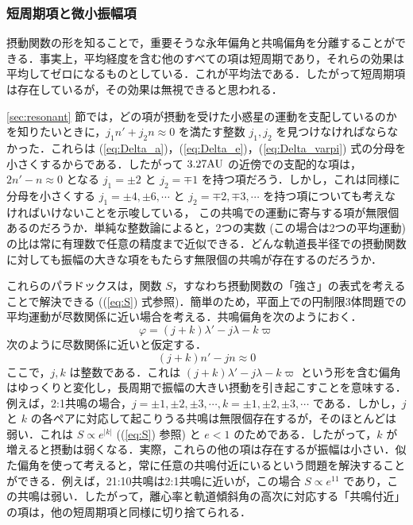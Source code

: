 \documentclass[11pt,a4paper,oneside,onecolumn]{jreport}
\begin{document}
\subsubsection{短周期項と微小振幅項}
摂動関数の形を知ることで，重要そうな永年偏角と共鳴偏角を分離することができる．事実上，平均経度を含む他のすべての項は短周期であり，それらの効果は平均してゼロになるものとしている．これが平均法である．したがって短周期項は存在しているが，その効果は無視できると思われる．

\ref{sec:resonant} 節では，どの項が摂動を受けた小惑星の運動を支配しているのかを知りたいときに，$j_1 n' + j_2 n \approx 0$ を満たす整数 $j_1, j_2$ を見つけなければならなかった．これらは (\ref{eq:Delta_a})，(\ref{eq:Delta_e})，(\ref{eq:Delta_varpi}) 式の分母を小さくするからである．したがって $3.27 {\rm AU}$ の近傍での支配的な項は，$2 n' - n \approx 0$ となる $j_1 = \pm 2$ と $j_2 = \mp 1$ を持つ項だろう．しかし，これは同様に分母を小さくする $j_1 = \pm 4, \pm 6, \cdots$ と $j_2 = \mp 2, \mp 3, \cdots$ を持つ項についても考えなければいけないことを示唆している，  
この共鳴での運動に寄与する項が無限個あるのだろうか．単純な整数論によると，2つの実数 (この場合は2つの平均運動) の比は常に有理数で任意の精度まで近似できる．どんな軌道長半径での摂動関数に対しても振幅の大きな項をもたらす無限個の共鳴が存在するのだろうか．

これらのパラドックスは，関数 $S$，すなわち摂動関数の「強さ」の表式を考えることで解決できる ((\ref{eq:S}) 式参照)．簡単のため，平面上での円制限3体問題での平均運動が尽数関係に近い場合を考える．共鳴偏角を次のようにおく．
\begin{equation}
\varphi = (j + k) \lambda' - j \lambda - k \varpi
\end{equation}
次のように尽数関係に近いと仮定する．
\begin{equation}
(j + k) n' - j n \approx 0
\end{equation}
ここで，$j, k$ は整数である．これは $(j + k) \lambda' - j \lambda - k \varpi$ という形を含む偏角はゆっくりと変化し，長周期で振幅の大きい摂動を引き起こすことを意味する．例えば，2:1共鳴の場合，$j = \pm 1, \pm 2, \pm 3, \cdots, k = \pm 1, \pm 2, \pm 3, \cdots$ である．しかし，$j$ と $k$ の各ペアに対応して起こりうる共鳴は無限個存在するが，そのほとんどは弱い．これは $S \propto e^{|k|}$ ((\ref{eq:S}) 参照) と $e < 1$ のためである．したがって，$k$ が増えると摂動は弱くなる．実際，これらの他の項は存在するが振幅は小さい．似た偏角を使って考えると，常に任意の共鳴付近にいるという問題を解決することができる．例えば，21:10共鳴は2:1共鳴に近いが，この場合 $S \propto e^{11}$ であり，この共鳴は弱い．したがって，離心率と軌道傾斜角の高次に対応する「共鳴付近」の項は，他の短周期項と同様に切り捨てられる．
\end{document}
